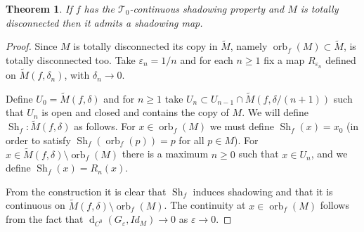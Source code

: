 \documentclass[12pt]{amsart}
\theoremstyle{plain}
\newtheorem{thm}{Theorem}[section]
\theoremstyle{definition}
\theoremstyle{remark}
\DeclareMathOperator{\dist}{d}
\DeclareMathOperator{\orb}{orb}
\DeclareMathOperator{\shm}{Sh}
\renewcommand{\epsilon}{\varepsilon}
\newcommand{\tM}{\tilde{M}}
\begin{document}
\begin{thm}
 If $f$ has the $\mathcal{T}_0$-continuous shadowing property and $M$ is totally disconnected then it admits a shadowing map.
\end{thm}

\begin{proof}
	Since $M$ is totally disconnected its copy in $\tM$, namely $\orb_f(M)\subset\tM$, is totally disconnected too.
	Take $\epsilon_n=1/n$ and for each $n\geq 1$ fix a map $R_{\epsilon_n}$
	defined on $\tM(f,\delta_n)$, with $\delta_n\to 0$.

	Define $U_0=\tM(f,\delta)$ and for $n\geq 1$
	take $U_n\subset U_{n-1}\cap\tM(f,\delta/(n+1))$ such that
	$U_n$ is open and closed and contains the copy of $M$.
	We will define $\shm_f\colon\tM(f,\delta)$ as follows.
	For $x\in \orb_f(M)$ we must define $\shm_f(x)=x_0$ (in order to satisfy $\shm_f(\orb_f(p))=p$ for all $p\in M$).
	For $x\in \tM(f,\delta)\setminus\orb_f(M)$
	there is a maximum $n\geq 0$ such that $x\in U_n$, and we define
	$\shm_f(x)=R_n(x)$.

	From the construction it is clear that $\shm_f$ induces shadowing and that it is continuous on $\tM(f,\delta)\setminus\orb_f(M)$.
  The continuity at $x\in\orb_f(M)$ follows from the fact that
	$\dist_{C^0}(G_\epsilon,Id_M)\to 0$ as $\epsilon\to 0$.
\end{proof}
\end{document}
